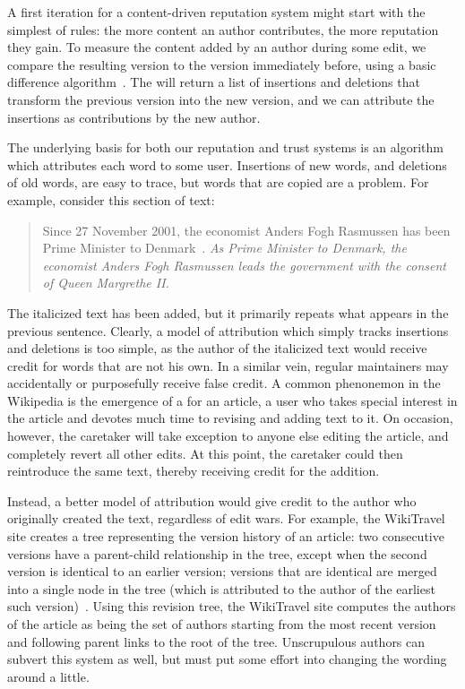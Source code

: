 
A first iteration for a content-driven reputation system
might start with the simplest of rules: the more content
an author contributes, the more reputation they gain.
To measure the content added by an author during some edit,
we compare the resulting version to the version immediately before,
using a basic difference algorithm~\cite{Myers86,TichyEditDist,BurnsLong97}.
The  will return a list of insertions
and deletions that transform the previous version into
the new version, and we can attribute the insertions
as contributions by the new author.

The underlying basis for both our reputation and trust systems
is an algorithm which attributes each word to some user.
Insertions of new words, and deletions of old words,
are easy to trace, but words that are copied are a problem.
For example, consider this section of text:
%
\begin{quote}
Since 27 November 2001, the economist Anders Fogh Rasmussen
has been Prime Minister to Denmark~\cite{wiki:Denmark-Fogh}.
\textit{As Prime Minister to Denmark, the economist Anders Fogh Rasmussen
leads the government with the consent of Queen Margrethe II.}
\end{quote}
%
The italicized text has been added, but it primarily repeats
what appears in the previous sentence.
Clearly, a model of attribution which simply tracks insertions
and deletions is too simple, as the author of the italicized
text would receive credit for words that are not his own.
In a similar vein,
regular maintainers may accidentally or purposefully receive
false credit.
A common phenonemon in the Wikipedia is the emergence
of a  for an article, a user who takes
special interest in the article and devotes much time
to revising and adding text to it.
On occasion, however, the caretaker will take exception to
anyone else editing the article, and completely revert all other edits.
At this point, the caretaker could then reintroduce
the same text, thereby receiving credit for the addition.

Instead, a better model of attribution would give credit
to the author who originally created the text,
regardless of edit wars.
For example, the WikiTravel site creates a tree representing
the version history of an article: two consecutive versions
have a parent-child relationship in the tree, except when
the second version is identical to an earlier version;
versions that are identical are merged into a single node
in the tree (which is attributed to the author of the earliest
such version)~\cite{WikiTravelAuthorship}.
Using this revision tree, the WikiTravel site computes the
authors of the article as being the set of authors starting
from the most recent version and following parent links
to the root of the tree.
Unscrupulous authors can subvert this system as
well, but must put some effort into changing
the wording around a little.

